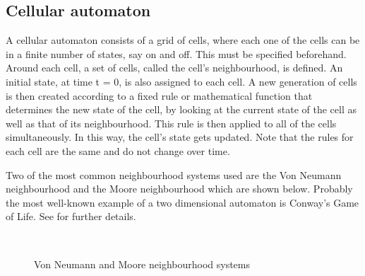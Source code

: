 \documentclass[a4paper,10pt]{article}
\begin{document}
\subsection{Cellular automaton}
A cellular automaton consists of a grid of cells, where each one of the cells
can be in a finite number of states, say on and off.  This must be specified
beforehand.  Around each cell, a set of cells, called the cell's neighbourhood,
is defined.  An initial state, at time t = 0, is also assigned to each cell.  A
new generation of cells is then created according to a fixed rule or
mathematical function that determines the new state of the cell, by looking at
the current state of the cell as well as that of its neighbourhood.  This rule
is then applied to all of the cells simultaneously.  In this way, the cell's
state gets updated.  Note that the rules for each cell are the same and do not
change over time.  

Two of the most common neighbourhood systems used are the Von
Neumann neighbourhood and the Moore neighbourhood which are shown below. 
Probably the most well-known example of a two dimensional automaton is Conway's
Game of Life.  See \cite{gol} for further details.

\begin{figure}[H]
\centering
\mbox{ \quad
{}} \caption{Von Neumann and
Moore neighbourhood systems \cite{n}}
\end{figure}
\end{document}
